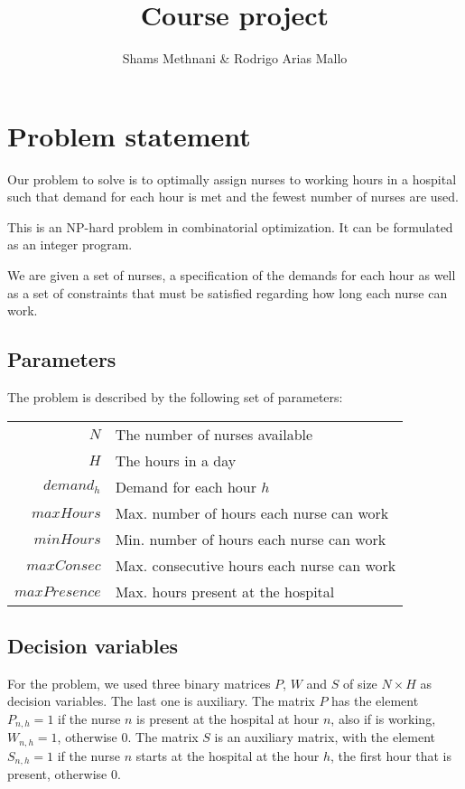\documentclass[12pt,a4paper]{article}
\title{Course project}
\author{Shams Methnani \& Rodrigo Arias Mallo}
\begin{document}
\maketitle

\section{Problem statement}


Our problem to solve is to optimally assign nurses to working hours in a 
hospital such that demand for each hour is met and the fewest number of nurses 
are used.

This is an NP-hard problem in combinatorial optimization. It can be formulated 
as an integer program.

We are given a set of nurses, a specification of the demands for each hour as 
well as a set of constraints that must be satisfied regarding how long each 
nurse can work.

\subsection{Parameters}

The problem is described by the following set of parameters:
%
\begin{center}
\begin{tabular}{rl}
$N$             & The number of nurses available \\
$H$             & The hours in a day \\
$demand_h$ 			&	Demand for each hour $h$ \\
$maxHours$ 			& Max. number of hours each nurse can work \\
$minHours$ 			& Min. number of hours each nurse can work \\
$maxConsec$ 		& Max. consecutive hours each nurse can work \\
$maxPresence$ 	& Max. hours present at the hospital\\
\end{tabular}
\end{center}
%
\subsection{Decision variables}

For the problem, we used three binary matrices $P$, $W$ and $S$ of size $N 
\times H$ as decision variables.  The last one is auxiliary. The matrix $P$ has 
the element $P_{n,h} = 1$ if the nurse $n$ is present at the hospital
at hour $n$, also if is working, $W_{n,h} = 1$, otherwise 0. The matrix $S$ is 
an auxiliary matrix, with the element $S_{n,h} = 1$ if the nurse $n$ starts at 
the hospital at the hour $h$, the first hour that is present, otherwise 0.
\end{document}
